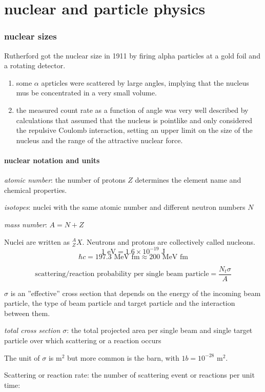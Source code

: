 \documentclass[10pt, a4paper, twocolumn]{article}
\newcommand{\deff}[1]{\par \noindent \textit{#1}: }
\begin{document}
\newpage
\part{nuclear and particle physics}
\setcounter{section}{0}
\section{nuclear sizes}

Rutherford got the nuclear size in 1911 by firing alpha particles at a gold foil and a rotating detector.
\begin{enumerate}
\item some $\alpha$ aprticles were scattered by large angles, implying that the nucleus mus be concentrated in a very small volume.
\item the measured count rate as a function of angle was very well described by calculations that assumed that the nucleus is pointlike and only considered the repulsive Coulomb interaction, setting an upper limit on the size of the nucleus and the range of the attractive nuclear force.
\end{enumerate}

\subsection{nuclear notation and units}

\deff{atomic number} the number of protons $Z$ determines the element name and chemical properties.
\deff{isotopes} nuclei with the same atomic number and different neutron numbers $N$
\deff{mass number} $A=N+Z$


Nuclei are written as $_Z^AX$. Neutrons and protons are collectively called nucleons.
\[1\text{ eV} = 1.6\times 10^{-19}\text{ J}\]
\[\hbar c = 197.3\text{ MeV fm}
\approx 200\text{ MeV fm}\]

\[\text{scattering/reaction probability per
single beam particle} = \frac{N_t\sigma}{A}\]

$\sigma$ is an ''effective'' cross section that depends on the energy of the incoming beam particle, the type of beam particle and target particle and the interaction between them.
\deff{total cross section $\sigma$} the total projected area per single beam and single target particle over which scattering or a reaction occurs

The unit of $\sigma$ is m$^2$ but more common is the barn, with $1b=10^{-28}\text{ m}^2$.

Scattering or reaction rate: the number of scattering event or reactions per unit time:
\end{document}

